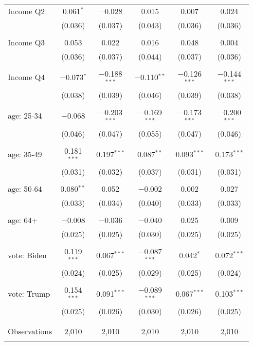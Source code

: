 \begin{tabular}{@{\extracolsep{5pt}}lccccc}
 Income Q2 & 0.061$^{*}$ & $-$0.028 & 0.015 & 0.007 & 0.024 \\ 
  & (0.036) & (0.037) & (0.043) & (0.036) & (0.036) \\ 
  & & & & & \\ 
 Income Q3 & 0.053 & 0.022 & 0.016 & 0.048 & 0.004 \\ 
  & (0.036) & (0.037) & (0.044) & (0.037) & (0.036) \\ 
  & & & & & \\ 
 Income Q4 & $-$0.073$^{*}$ & $-$0.188$^{***}$ & $-$0.110$^{**}$ & $-$0.126$^{***}$ & $-$0.144$^{***}$ \\ 
  & (0.038) & (0.039) & (0.046) & (0.039) & (0.038) \\ 
  & & & & & \\ 
 age: 25-34 & $-$0.068 & $-$0.203$^{***}$ & $-$0.169$^{***}$ & $-$0.173$^{***}$ & $-$0.200$^{***}$ \\ 
  & (0.046) & (0.047) & (0.055) & (0.047) & (0.046) \\ 
  & & & & & \\ 
 age: 35-49 & 0.181$^{***}$ & 0.197$^{***}$ & 0.087$^{**}$ & 0.093$^{***}$ & 0.173$^{***}$ \\ 
  & (0.031) & (0.032) & (0.037) & (0.031) & (0.031) \\ 
  & & & & & \\ 
 age: 50-64 & 0.080$^{**}$ & 0.052 & $-$0.002 & 0.002 & 0.027 \\ 
  & (0.033) & (0.034) & (0.040) & (0.033) & (0.033) \\ 
  & & & & & \\ 
 age: 64+ & $-$0.008 & $-$0.036 & $-$0.040 & 0.025 & 0.009 \\ 
  & (0.025) & (0.025) & (0.030) & (0.025) & (0.025) \\ 
  & & & & & \\ 
 vote: Biden & 0.119$^{***}$ & 0.067$^{***}$ & $-$0.087$^{***}$ & 0.042$^{*}$ & 0.072$^{***}$ \\ 
  & (0.024) & (0.025) & (0.029) & (0.025) & (0.024) \\ 
  & & & & & \\ 
 vote: Trump & 0.154$^{***}$ & 0.091$^{***}$ & $-$0.089$^{***}$ & 0.067$^{***}$ & 0.103$^{***}$ \\ 
  & (0.025) & (0.026) & (0.030) & (0.026) & (0.025) \\ 
  & & & & & \\ 
\hline \\[-1.8ex] 

Observations & 2,010 & 2,010 & 2,010 & 2,010 & 2,010 \\ 
\hline 
\hline \\[-1.8ex] 
\end{tabular} 